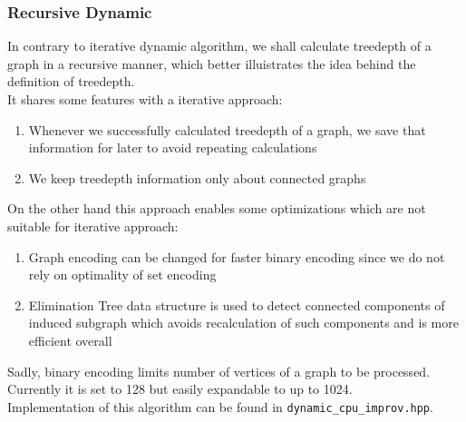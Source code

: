 \documentclass[a4paper]{article}
\begin{document}
	\subsubsection{Recursive Dynamic}
	In contrary to iterative dynamic algorithm, we shall calculate treedepth of a graph in a recursive manner, which better illuistrates the idea behind the definition of treedepth.\\
	It shares some features with a iterative approach:
	\begin{enumerate}
		\item Whenever we successfully calculated treedepth of a graph, we save that information for later to avoid repeating calculations
		\item We keep treedepth information only about connected graphs
	\end{enumerate}
	On the other hand this approach enables some optimizations which are not suitable for iterative approach:
	\begin{enumerate}
		\item Graph encoding can be changed for faster binary encoding since we do not rely on optimality of set encoding
		\item Elimination Tree data structure is used to detect connected components of induced subgraph which avoids recalculation of such components and is more efficient overall
	\end{enumerate}
	Sadly, binary encoding limits number of vertices of a graph to be processed. Currently it is set to 128 but easily expandable to up to 1024.\\
	Implementation of this algorithm can be found in \texttt{dynamic\_cpu\_improv.hpp}.
	\newpage
\end{document}
